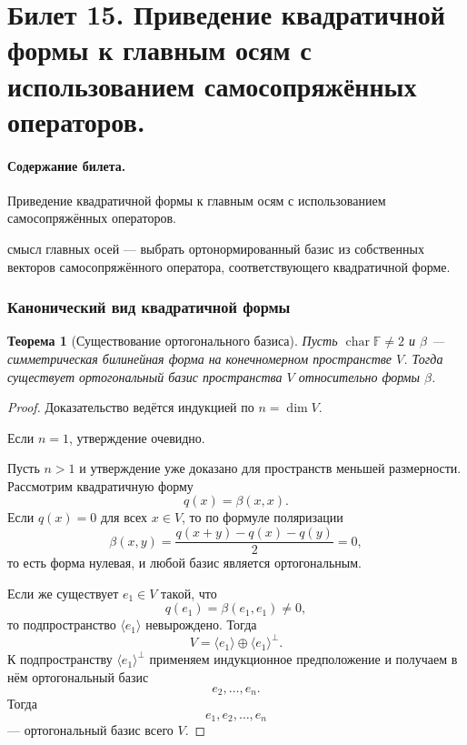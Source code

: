 \documentclass[12pt,a4paper]{article}
\theoremstyle{definition}
\theoremstyle{plain}
\newtheorem{theorem}[definition]{Теорема}
\theoremstyle{remark}
\newenvironment{planadd}{\begin{planbox}}{\end{planbox}}
\newcommand{\F}{\mathbb{F}}
\begin{document}
\clearpage

\section{Билет 15. Приведение квадратичной формы к главным осям с использованием самосопряжённых операторов.}

\paragraph{Содержание билета.} Приведение квадратичной формы к главным осям с использованием самосопряжённых операторов.

\begin{planadd}

смысл главных осей — выбрать ортонормированный базис из собственных векторов самосопряжённого оператора, соответствующего квадратичной форме.

\end{planadd}

\subsubsection{Канонический вид квадратичной формы}


\begin{theorem}[Существование ортогонального базиса]
Пусть $\operatorname{char}\F\ne2$ и $\beta$ --- симметрическая билинейная форма на конечномерном пространстве $V$.
Тогда существует ортогональный базис пространства $V$ относительно формы $\beta$.
\end{theorem}

\begin{proof}
Доказательство ведётся индукцией по $n=\dim V$.

Если $n=1$, утверждение очевидно.

Пусть $n>1$ и утверждение уже доказано для пространств меньшей размерности.
Рассмотрим квадратичную форму
\[
    q(x)=\beta(x,x).
\]
Если $q(x)=0$ для всех $x\in V$, то по формуле поляризации
\[
    \beta(x,y)=\frac{q(x+y)-q(x)-q(y)}{2}=0,
\]
то есть форма нулевая, и любой базис является ортогональным.

Если же существует $e_1\in V$ такой, что
\[
    q(e_1)=\beta(e_1,e_1)\ne0,
\]
то подпространство $\langle e_1\rangle$ невырождено. Тогда
\[
    V=\langle e_1\rangle\oplus \langle e_1\rangle^\perp.
\]
К подпространству $\langle e_1\rangle^\perp$ применяем индукционное предположение и получаем в нём ортогональный базис
\[
    e_2,\ldots,e_n.
\]
Тогда
\[
    e_1,e_2,\ldots,e_n
\]
--- ортогональный базис всего $V$.
\end{proof}
\end{document}
